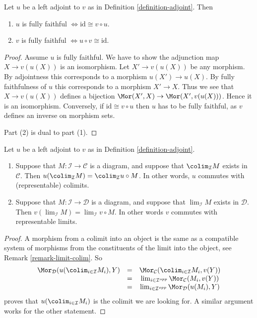 \begin{lemma}
\label{lemma-adjoint-fully-faithful}
Let $u$ be a left adjoint to $v$ as in Definition \ref{definition-adjoint}.
Then
\begin{enumerate}
\item $u$ is fully faithful $\Leftrightarrow \text{id} \cong v \circ u$.
\item $v$ is fully faithful $\Leftrightarrow u \circ v \cong \text{id}$.
\end{enumerate}
\end{lemma}

\begin{proof}
Assume $u$ is fully faithful. We have to show the adjunction map
$X \to v(u(X))$ is an isomorphism. Let $X' \to v(u(X))$ be any morphism.
By adjointness this corresponds to a morphism $u(X') \to u(X)$. By fully
faithfulness of $u$ this corresponds to a morphism $X' \to X$. Thus we
see that $X \to v(u(X))$ defines a bijection
$\Mor(X', X) \to \Mor(X', v(u(X)))$. Hence it is an isomorphism.
Conversely, if $\text{id} \cong v \circ u$ then $u$ has to be fully
faithful, as $v$ defines an inverse on morphism sets.

\medskip\noindent
Part (2) is dual to part (1).
\end{proof}

\begin{lemma}
\label{lemma-adjoint-exact}
Let $u$ be a left adjoint to $v$ as in Definition \ref{definition-adjoint}.
\begin{enumerate}
\item Suppose that $M : \mathcal{I} \to \mathcal{C}$ is a diagram,
and suppose that $\colim_\mathcal{I} M$ exists in
$\mathcal{C}$. Then $u(\colim_\mathcal{I} M) =
\colim_\mathcal{I} u \circ M$. In other words,
$u$ commutes with (representable) colimits.
\item Suppose that $M : \mathcal{I} \to \mathcal{D}$ is a diagram,
and suppose that $\lim_\mathcal{I} M$ exists in
$\mathcal{D}$. Then $v(\lim_\mathcal{I} M) =
\lim_\mathcal{I} v \circ M$. In other words $v$ commutes
with representable limits.
\end{enumerate}
\end{lemma}

\begin{proof}
A morphism from a colimit into an object is the same as a compatible
system of morphisms from the constituents of the limit into the
object, see Remark \ref{remark-limit-colim}. So
$$
\begin{matrix}
\Mor_\mathcal{D}(u(\colim_{i \in \mathcal{I}} M_i), Y) &
= & \Mor_\mathcal{C}(\colim_{i \in \mathcal{I}} M_i, v(Y)) \\
& = &
\lim_{i \in \mathcal{I}^{opp}}
\Mor_\mathcal{C}(M_i, v(Y)) \\
& = &
\lim_{i \in \mathcal{I}^{opp}}
\Mor_\mathcal{D}(u(M_i), Y)
\end{matrix}
$$
proves that $u(\colim_{i \in \mathcal{I}} M_i)$ is
the colimit we are looking for.
A similar argument works for the other statement.
\end{proof}

